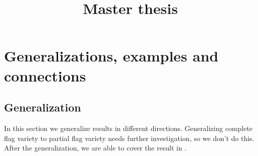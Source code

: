 \documentclass[reqno,11pt]{book}
\numberwithin{equation}{section}
\theoremstyle{plain}
\theoremstyle{plain}
\numberwithin{equation}{section}
\theoremstyle{remark}
\begin{document}
\date{}

\title
{Master thesis
}




\setcounter{tocdepth}{1}











\chapter{Generalizations, examples and connections}
\section{Generalization}\label{sec:generalization}
In this section we generalize results in different directions. Generalizing complete flag variety to partial flag variety needs further investigation, so we don't do this. After the generalization, we are able to cover the result in \cite[Theorem 7.2.5]{chriss1997representation}.
\end{document}

